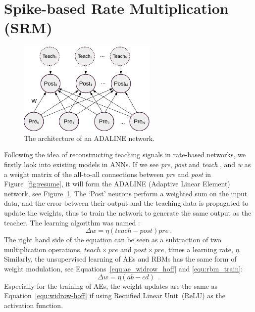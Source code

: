 \section{Spike-based Rate Multiplication (SRM)}
\label{sec:SRM}
\begin{figure}
	\centering
	\includegraphics[width=0.6\textwidth]{pics_sdlm/adaline.pdf}
	\caption{The architecture of an ADALINE network.}
	\label{fig:adaline}
\end{figure}
Following the idea of reconstructing teaching signals in rate-based networks, we firstly look into existing models in ANNs.
If we see \textit{pre}, \textit{post} and \textit{teach} \DIFdelbegin {}\DIFdelend \DIFaddbegin {}\DIFaddend , and \textit{w} as a weight matrix of the all-to-all connections between \textit{pre} and \textit{post} in Figure~\ref{fig:resume}, it will form the ADALINE (Adaptive Linear Element)~\citep{widrow1960adaptive} network, see Figure~\ref{fig:adaline}.
The `Post' neurons perform a weighted sum on the input data, and the error between their output and the teaching data is propagated to update the weights, thus to train the network to generate the same output as the teacher\DIFdelbegin {}\DIFdelend . 
The learning algorithm was named \DIFdelbegin {}\DIFdelend \DIFaddbegin {}\DIFaddend :
\begin{equation}
\Delta w = \eta (teach - post)pre~.
\label{equ:widrow-hoff}
\end{equation}
The right hand side of the equation can be seen as a subtraction of two multiplication operations, $teach \times pre$ and $post \times pre$, times a learning rate, $\eta$.
Similarly, the unsupervised learning of AEs and RBMs has the same form of weight modulation, see Equations~\ref{equ:ae_widrow_hoff} \DIFdelbegin \DIFdel{) }\DIFdelend and \ref{equ:rbm_train}:
\begin{equation}
\Delta w = \eta (ab-cd)~~.
\label{equ:two_sep}
\end{equation}
Especially for the training of AEs, the weight updates are the same as Equation~\ref{equ:widrow-hoff} if using \DIFaddbegin {}\DIFaddend Rectified Linear Unit~(ReLU) as the activation function.

